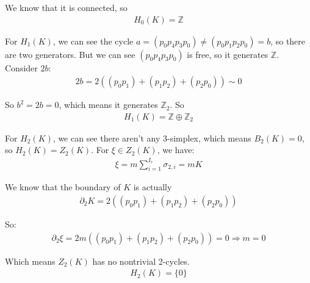 \documentclass[]{ctexart}
\newcommand{\pa}{\partial}
\begin{document}
		We know that it is connected, so 
			\begin{equation*}
			\begin{aligned}
				H_0(K)=\mathbb{Z}
			\end{aligned}
			\end{equation*}
			
		For $H_1(K)$, we can see the cycle $a=(p_0p_4p_3p_0)\neq(p_0p_1p_2p_0)=b$, so there are two generators. But we can see $(p_0p_4p_3p_0)$ is free, so it generates $\mathbb{Z}$. Consider $2b$: 
			\begin{equation*}
			\begin{aligned}
				2b=2\left((p_0p_1)+(p_1p_2)+(p_2p_0)\right)\sim 0
			\end{aligned}
			\end{equation*}
			
		So $b^2=2b=0$, which means it generates $\mathbb{Z}_2$. So
			\begin{equation*}
			\begin{aligned}
				H_1(K)=\mathbb{Z}\oplus \mathbb{Z}_2
			\end{aligned}
			\end{equation*}
			
		For $H_2(K)$, we can see there aren't any 3-simplex, which means $B_2(K)=0$, so $H_2(K)=Z_2(K)$. For $\xi\in Z_2(K)$, we have:
			\begin{equation*}
			\begin{aligned}
				\xi=m\sum_{i=1}^{I_r}\sigma_{2,i}=mK
			\end{aligned}
			\end{equation*}
			
		We know that the boundary of $K$ is actually 
			\begin{equation*}
			\begin{aligned}
				\pa_2K=2\left((p_0p_1)+(p_1p_2)+(p_2p_0)\right)
			\end{aligned}
			\end{equation*}
			
		So:
			\begin{equation*}
			\begin{aligned}
				\pa_2\xi=2m\left((p_0p_1)+(p_1p_2)+(p_2p_0)\right)=0\Rightarrow m=0
			\end{aligned}
			\end{equation*}
			
		Which means $Z_2(K)$ has no nontrivial 2-cycles. 
			\begin{equation*}
			\begin{aligned}
				H_2(K)=\{0\}
			\end{aligned}
			\end{equation*}
			
\end{document}
